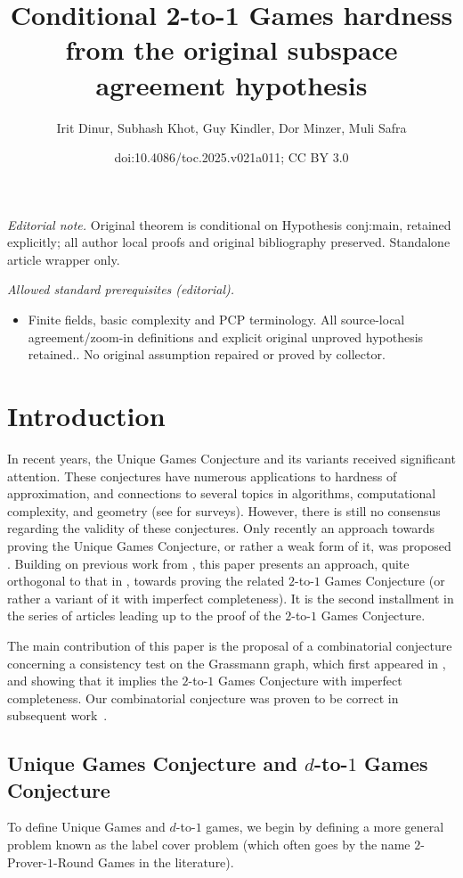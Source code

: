 \documentclass[11pt]{article}
\title{Conditional 2-to-1 Games hardness from the original subspace agreement hypothesis}
\author{Irit Dinur, Subhash Khot, Guy Kindler, Dor Minzer, Muli Safra}
\date{doi:10.4086/toc.2025.v021a011; CC BY 3.0}
\numberwithin{equation}{section}
\theoremstyle{definition}
\theoremstyle{plain}
\begin{document}
\maketitle
\noindent\textit{Editorial note.} Original theorem is conditional on Hypothesis conj:main, retained explicitly; all author local proofs and original bibliography preserved. Standalone article wrapper only.\par\medskip
\noindent\textit{Allowed standard prerequisites (editorial).}\begin{itemize}
\item Finite fields, basic complexity and PCP terminology. All source-local agreement/zoom-in definitions and explicit original unproved hypothesis retained.. No original assumption repaired or proved by collector.
\end{itemize}\medskip
\section{Introduction}
In recent years, the Unique Games Conjecture \cite{Khot02} and its variants received
significant attention. These conjectures have numerous applications to hardness
of approximation, and connections to several topics in algorithms, computational
complexity, and geometry (see \cite{Trevisan-survey,KhotUGC-survey,
  KhotICM-survey} for surveys).  However, there is still no consensus regarding
the validity of these conjectures. Only recently an approach towards
proving the Unique Games Conjecture, or rather a weak form of it, was
proposed \cite{KhotMoshkovitz}. Building on previous work from \cite{KMS}, this
paper presents an
approach, quite orthogonal to that in \cite{KhotMoshkovitz}, towards proving the
related $2$-to-$1$ Games Conjecture (or rather a variant of it with imperfect
completeness).
%
It is the second installment in the series of %
articles   %
\cite{KMS,DKKMS1,DKKMSgras,KMS2}
leading up to the proof of the $2$-to-$1$ Games Conjecture.

The main contribution of this paper is the proposal of a combinatorial conjecture
concerning a consistency test on the Grassmann graph, which first appeared in \cite{KMS}, and showing
that it implies the $2$-to-$1$ Games Conjecture with imperfect completeness. Our combinatorial
conjecture was proven to be correct in subsequent %
work~\cite{KMS2}.  %
%
%


\subsection{Unique Games Conjecture and \texorpdfstring{$d$-to-$1$}{2-to1} Games Conjecture}
To define Unique Games and $d$-to-$1$ games, we begin by defining a more
general problem known as the label cover problem (which often goes by
the name $2$-Prover-$1$-Round Games in the literature).
\end{document}
